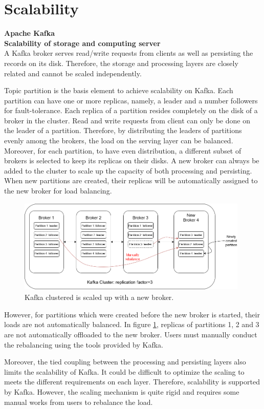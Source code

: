 \section{Scalability}
\large \textbf{Apache Kafka}\\
\normalsize
\textbf{Scalability of storage and computing server}\\
A Kafka broker serves read/write requests from clients as well as persisting the records on its disk. Therefore, the storage and processing layers are closely related and cannot be scaled independently.  

Topic partition is the basis element to achieve scalability on Kafka. Each partition can have one or more replicas, namely, a leader and a number followers for fault-tolerance. Each replica of a partition resides completely on the disk of a broker in the cluster. Read and write requests from client can only be done on the leader of a partition. Therefore, by distributing the leaders of partitions evenly among the brokers, the load on the serving layer can be balanced. Moreover, for each partition, to have even distribution, a different subset of brokers is selected to keep its replicas on their disks. A new broker can always be added to the cluster to scale up the capacity of both processing and persisting. When new partitions are created, their replicas will be automatically assigned to the new broker for load balancing.
\begin{figure}[h]
	\centering
	\includegraphics[width=11cm,height=4.5cm]{images/scalability-kafka.png}
	\caption{Kafka clustered is scaled up with a new broker.}
	\label{fig:scalabilitykafka}
\end{figure}

However, for partitions which were created before the new broker is started, their loads are not automatically balanced. In figure \ref{fig:scalabilitykafka}, replicas of partitions 1, 2 and 3 are not automatically offloaded to the new broker. Users must manually conduct the rebalancing using the tools provided by Kafka.

Moreover, the tied coupling between the processing and persisting layers also limits the scalability of Kafka. It could be difficult to optimize the scaling to meets the different requirements on each layer. Therefore, scalability is supported by Kafka. However, the scaling mechanism is quite rigid and requires some manual works from users to rebalance the load. 

